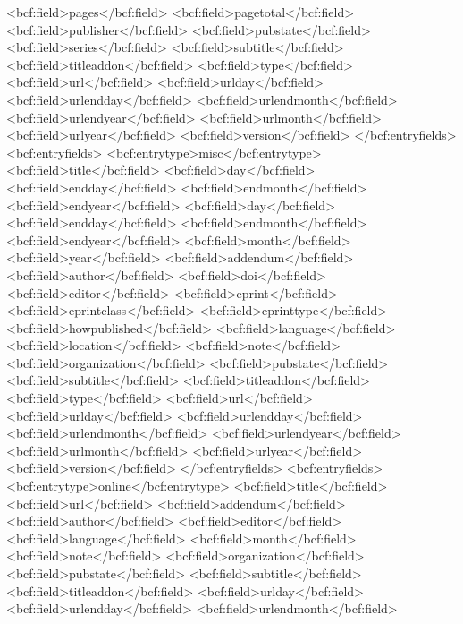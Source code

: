       <bcf:field>pages</bcf:field>
      <bcf:field>pagetotal</bcf:field>
      <bcf:field>publisher</bcf:field>
      <bcf:field>pubstate</bcf:field>
      <bcf:field>series</bcf:field>
      <bcf:field>subtitle</bcf:field>
      <bcf:field>titleaddon</bcf:field>
      <bcf:field>type</bcf:field>
      <bcf:field>url</bcf:field>
      <bcf:field>urlday</bcf:field>
      <bcf:field>urlendday</bcf:field>
      <bcf:field>urlendmonth</bcf:field>
      <bcf:field>urlendyear</bcf:field>
      <bcf:field>urlmonth</bcf:field>
      <bcf:field>urlyear</bcf:field>
      <bcf:field>version</bcf:field>
    </bcf:entryfields>
    <bcf:entryfields>
      <bcf:entrytype>misc</bcf:entrytype>
      <bcf:field>title</bcf:field>
      <bcf:field>day</bcf:field>
      <bcf:field>endday</bcf:field>
      <bcf:field>endmonth</bcf:field>
      <bcf:field>endyear</bcf:field>
      <bcf:field>day</bcf:field>
      <bcf:field>endday</bcf:field>
      <bcf:field>endmonth</bcf:field>
      <bcf:field>endyear</bcf:field>
      <bcf:field>month</bcf:field>
      <bcf:field>year</bcf:field>
      <bcf:field>addendum</bcf:field>
      <bcf:field>author</bcf:field>
      <bcf:field>doi</bcf:field>
      <bcf:field>editor</bcf:field>
      <bcf:field>eprint</bcf:field>
      <bcf:field>eprintclass</bcf:field>
      <bcf:field>eprinttype</bcf:field>
      <bcf:field>howpublished</bcf:field>
      <bcf:field>language</bcf:field>
      <bcf:field>location</bcf:field>
      <bcf:field>note</bcf:field>
      <bcf:field>organization</bcf:field>
      <bcf:field>pubstate</bcf:field>
      <bcf:field>subtitle</bcf:field>
      <bcf:field>titleaddon</bcf:field>
      <bcf:field>type</bcf:field>
      <bcf:field>url</bcf:field>
      <bcf:field>urlday</bcf:field>
      <bcf:field>urlendday</bcf:field>
      <bcf:field>urlendmonth</bcf:field>
      <bcf:field>urlendyear</bcf:field>
      <bcf:field>urlmonth</bcf:field>
      <bcf:field>urlyear</bcf:field>
      <bcf:field>version</bcf:field>
    </bcf:entryfields>
    <bcf:entryfields>
      <bcf:entrytype>online</bcf:entrytype>
      <bcf:field>title</bcf:field>
      <bcf:field>url</bcf:field>
      <bcf:field>addendum</bcf:field>
      <bcf:field>author</bcf:field>
      <bcf:field>editor</bcf:field>
      <bcf:field>language</bcf:field>
      <bcf:field>month</bcf:field>
      <bcf:field>note</bcf:field>
      <bcf:field>organization</bcf:field>
      <bcf:field>pubstate</bcf:field>
      <bcf:field>subtitle</bcf:field>
      <bcf:field>titleaddon</bcf:field>
      <bcf:field>urlday</bcf:field>
      <bcf:field>urlendday</bcf:field>
      <bcf:field>urlendmonth</bcf:field>
